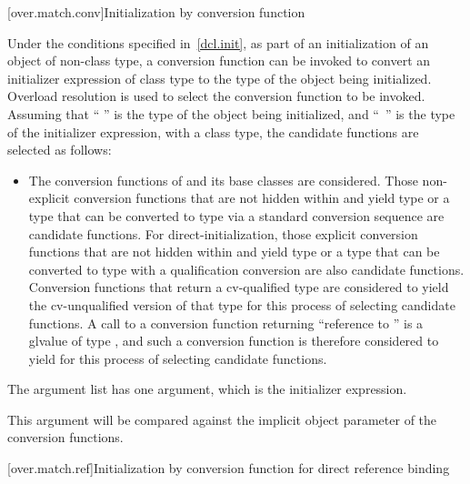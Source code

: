 [over.match.conv]{Initialization by conversion function}%

\pnum
Under the conditions specified in~\ref{dcl.init}, as
part of an initialization of an object of non-class type,
a conversion function can be invoked to convert an initializer
expression of class type to the type of the object
being initialized.
Overload resolution is used to select the
conversion function to be invoked.
Assuming that `` '' is the
type of the object being initialized, and ``\cv{}~'' is the type
of the initializer expression, with
a class type,
the candidate functions are selected as follows:

\begin{itemize}
\item
The conversion functions of
and its base classes are considered.
Those non-explicit conversion functions that are not hidden
within
and yield type
or a type that can be converted to type
via a standard conversion sequence
are candidate functions.
For direct-initialization, those explicit conversion functions that are not
hidden within  and yield type  or a type that can be converted
to type  with a qualification conversion are also
candidate functions.
Conversion functions that return a cv-qualified type
are considered to yield the cv-unqualified version of that type
for this process of selecting candidate functions.
A call to a conversion function returning ``reference to ''
is a glvalue of type , and such a conversion function is
therefore considered to yield  for this process of selecting
candidate functions.
\end{itemize}

\pnum
The argument list has one argument, which is the initializer expression.
\begin{note}
This argument will be compared against
the implicit object parameter of the conversion functions.
\end{note}

[over.match.ref]{Initialization by conversion function for direct reference binding}%

